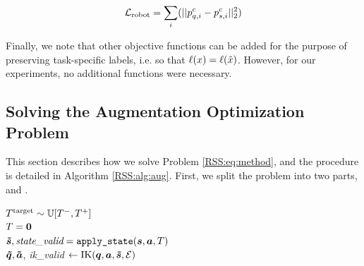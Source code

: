 \begin{equation}
\mathcal{L}_\text{robot}=\sum_i(||{p^c_{q,i} - p^c_{s,i}}||^2_2)
\end{equation}

Finally, we note that other objective functions can be added for the purpose of preserving task-specific labels, i.e. so that $\ell(x)=\ell(\Tilde{x})$. However, for our experiments, no additional functions were necessary.

\subsection{Solving the Augmentation Optimization Problem}

This section describes how we solve Problem \eqref{RSS:eq:method}, and the procedure is detailed in Algorithm \ref{RSS:alg:aug}. First, we split the problem into two parts, \augState{} and \augRobot{}.

\begin{algorithm}[t]
\caption{$\augf(\bm{\state},\bm{\robot},\bm{\action},\env)$}\label{RSS:alg:aug}
\Comment{\augState{}}
$ T^\text{target} \sim \mathbb{U}[T^-,T^+] $\\
$T = \mathbf{0}$  \\
\Comment{\augRobot{}}
$\bm{\Tilde{s}}, \textit{state\_valid} = \texttt{apply\_state}(\bm{s},\bm{a},T)$\\
$\bm{\Tilde{q}},\bm{\Tilde{a}}$, \textit{ik\_valid} $\leftarrow \mathrm{IK}(\bm{q},\bm{a},\bm{\Tilde{s}},\mathcal{E})$\\
\end{algorithm}

